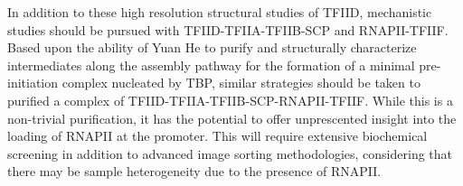 \indent In addition to these high resolution structural studies of TFIID, mechanistic studies should be pursued with TFIID-TFIIA-TFIIB-SCP and RNAPII-TFIIF. Based upon the ability of Yuan He to purify and structurally characterize intermediates along the assembly pathway for the formation of a minimal pre-initiation complex nucleated by TBP, similar strategies should be taken to purified a complex of TFIID-TFIIA-TFIIB-SCP-RNAPII-TFIIF. While this is a non-trivial purification, it has the potential to offer unprescented insight into the loading of RNAPII at the promoter. This will require extensive biochemical screening in addition to advanced image sorting methodologies, considering that there may be sample heterogeneity due to the presence of RNAPII.\\
